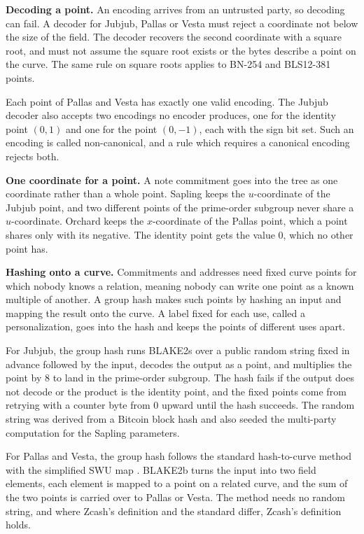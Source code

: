 \documentclass{article}
\let\oldcite\cite
\renewcommand{\cite}[2][]{\raisebox{0ex}{\oldcite[{#1}]{#2}}}
\theoremstyle{labelledtheorem} %
\begin{document}
\textbf{Decoding a point.} An encoding arrives from an untrusted party, so decoding can fail. A decoder for Jubjub, Pallas or Vesta must reject a coordinate not below the size of the field. The decoder recovers the second coordinate with a square root, and must not assume the square root exists or the bytes describe a point on the curve. The same rule on square roots applies to BN-254 and BLS12-381 points.

Each point of Pallas and Vesta has exactly one valid encoding. The Jubjub decoder also accepts two encodings no encoder produces, one for the identity point $(0, 1)$ and one for the point $(0, -1)$, each with the sign bit set. Such an encoding is called non-canonical, and a rule which requires a canonical encoding rejects both.

\textbf{One coordinate for a point.} A note commitment goes into the tree as one coordinate rather than a whole point. Sapling keeps the $u$-coordinate of the Jubjub point, and two different points of the prime-order subgroup never share a $u$-coordinate. Orchard keeps the $x$-coordinate of the Pallas point, which a point shares only with its negative. The identity point gets the value 0, which no other point has.

\textbf{Hashing onto a curve.} Commitments and addresses need fixed curve points for which nobody knows a relation, meaning nobody can write one point as a known multiple of another. A group hash makes such points by hashing an input and mapping the result onto the curve. A label fixed for each use, called a personalization, goes into the hash and keeps the points of different uses apart.

For Jubjub, the group hash runs BLAKE2s over a public random string fixed in advance followed by the input, decodes the output as a point, and multiplies the point by 8 to land in the prime-order subgroup. The hash fails if the output does not decode or the product is the identity point, and the fixed points come from retrying with a counter byte from 0 upward until the hash succeeds. The random string was derived from a Bitcoin block hash \cite{Bowe2018} and also seeded the multi-party computation for the Sapling parameters.

For Pallas and Vesta, the group hash follows the standard hash-to-curve method with the simplified SWU map \cite{ID-hashtocurve}. BLAKE2b turns the input into two field elements, each element is mapped to a point on a related curve, and the sum of the two points is carried over to Pallas or Vesta. The method needs no random string, and where Zcash's definition and the standard differ, Zcash's definition holds.
\end{document}
